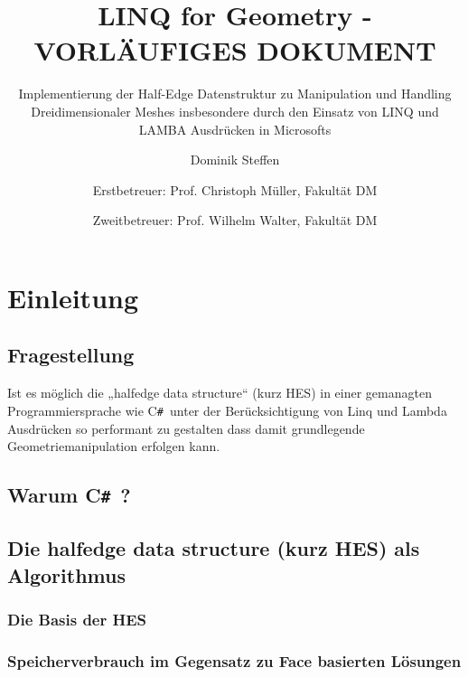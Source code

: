 \documentclass[12pt,a4paper]{scrreprt}
\author{
Dominik Steffen \and
Erstbetreuer: Prof. Christoph Müller, Fakultät DM \and
Zweitbetreuer: Prof. Wilhelm Walter, Fakultät DM
}
\title{LINQ for Geometry - VORLÄUFIGES DOKUMENT}
\subtitle{Implementierung der Half-Edge Datenstruktur zu Manipulation und Handling Dreidimensionaler Meshes insbesondere durch den Einsatz von LINQ und LAMBA Ausdrücken in Microsofts \CS}
\newcommand{\CSS}{C\texttt{\# }}
\begin{document}
\maketitle
\newpage

\begingroup
	\clearpage
	\pagestyle{empty}
	\renewcommand*{\chapterpagestyle}{empty}
	\tableofcontents
	\clearpage
\endgroup

\pagestyle{plain}
\setcounter{page}{1}










\chapter {Einleitung}
	\section {Fragestellung}
		Ist es möglich die „halfedge data structure“ (kurz HES) in einer gemanagten Programmiersprache wie \CSS unter der Berücksichtigung von Linq und Lambda Ausdrücken so performant zu gestalten dass damit grundlegende Geometriemanipulation erfolgen kann.
	\section {Warum \CSS ?}
	\section {Die halfedge data structure (kurz HES) als Algorithmus}
		\subsection {Die Basis der HES}
		\subsection {Speicherverbrauch im Gegensatz zu Face basierten Lösungen}
\end{document}
